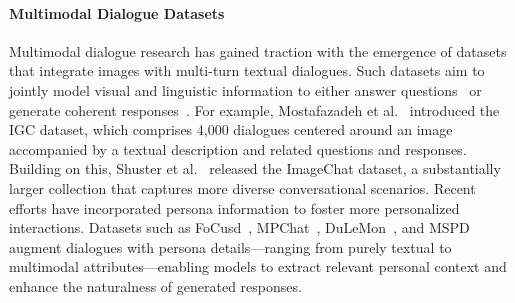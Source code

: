 \paragraph{Multimodal Dialogue Datasets}
Multimodal dialogue research has gained traction with the emergence of datasets that integrate images with multi-turn textual dialogues. Such datasets aim to jointly model visual and linguistic information to either answer questions~\cite{antol2015vqa,das2017visual,seo2017visual,kottur2019clevr,li2023stablellava} or generate coherent responses~\cite{meng2020openvidial,zheng2021mmchat,wang2021openvidial,zang2021photochat,feng2022mmdialog}. For example, Mostafazadeh et al.~\cite{mostafazadeh2017image} introduced the IGC dataset, which comprises 4,000 dialogues centered around an image accompanied by a textual description and related questions and responses. Building on this, Shuster et al.~\cite{shuster2018image} released the ImageChat dataset, a substantially larger collection that captures more diverse conversational scenarios.
Recent efforts have incorporated persona information to foster more personalized interactions. Datasets such as FoCusd~\cite{jang2022call}, MPChat~\cite{ahn2023mpchat}, DuLeMon~\cite{xu2022long}, and MSPD~\cite{kwon2023and} augment dialogues with persona details—ranging from purely textual to multimodal attributes—enabling models to extract relevant personal context and enhance the naturalness of generated responses.

